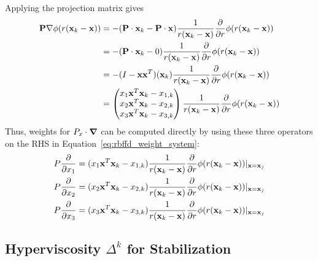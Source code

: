 \documentclass[11pt]{report}
\begin{document}
{Applying the projection matrix gives 
\begin{align*}
\mathbf{P} \nabla \phi(r(\mathbf{x}_k - \mathbf{x})) & = - (\mathbf{P} \cdot \mathbf{x}_k - \mathbf{P}\cdot\mathbf{x})\frac{1}{r(\mathbf{x}_k - \mathbf{x})}  \frac{\partial }{\partial r} \phi(r(\mathbf{x}_k - \mathbf{x})) \\
& =  - (\mathbf{P}\cdot\mathbf{x}_k - 0)\frac{1}{r(\mathbf{x}_k - \mathbf{x})}  \frac{\partial }{\partial r} \phi(r(\mathbf{x}_k - \mathbf{x})) \\
& = - (I-\mathbf{x}\mathbf{x}^T)(\mathbf{x}_k
)\frac{1}{r(\mathbf{x}_k - \mathbf{x})}  \frac{\partial }{\partial r} \phi(r(\mathbf{x}_k - \mathbf{x})) \\
& = \begin{pmatrix} x_1 \mathbf{x}^T \mathbf{x}_k - x_{1,k} \\ x_2 \mathbf{x}^T \mathbf{x}_k -  x_{2,k} \\ x_3 \mathbf{x}^T \mathbf{x}_k -x_{3,k} \end{pmatrix} \frac{1}{r(\mathbf{x}_k - \mathbf{x})}  \frac{\partial }{\partial r} \phi(r(\mathbf{x}_k - \mathbf{x})) 
 \end{align*}
Thus, weights for $P_{x}\cdot\mbox{\boldmath$ \nabla $}$ can be computed directly by using these three operators on the RHS in Equation~\ref{eq:rbffd_weight_system}: 
\begin{align*} 
P\frac{\partial }{\partial x_1} = ( x_1 \mathbf{x}^T \mathbf{x}_k - x_{1,k}) \frac{1}{r(\mathbf{x}_k - \mathbf{x})}  \frac{\partial }{\partial r} \phi(r(\mathbf{x}_k - \mathbf{x})) |_{\mathbf{x}=\mathbf{x}_j} \\
P\frac{\partial }{\partial x_2} = ( x_2 \mathbf{x}^T \mathbf{x}_k - x_{2,k}) \frac{1}{r(\mathbf{x}_k - \mathbf{x})}  \frac{\partial }{\partial r} \phi(r(\mathbf{x}_k - \mathbf{x})) |_{\mathbf{x}=\mathbf{x}_j} \\
P\frac{\partial }{\partial x_3} = ( x_3 \mathbf{x}^T \mathbf{x}_k - x_{3,k}) \frac{1}{r(\mathbf{x}_k - \mathbf{x})}  \frac{\partial }{\partial r} \phi(r(\mathbf{x}_k - \mathbf{x})) |_{\mathbf{x}=\mathbf{x}_j}
\end{align*}




\subsection{Hyperviscosity $\Delta^k$ for Stabilization}

}
\end{document}
